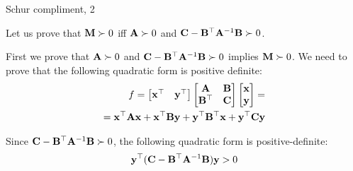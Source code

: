 \documentclass{beamer}
\begin{document}
\begin{frame}{Schur compliment, 2}
	\begin{flushleft}
		
		Let us prove that $\mathbf{M} \succ 0$ iff $\mathbf{A} \succ 0$ and $\mathbf{C} - \mathbf{B}^\top\mathbf{A}^{-1}\mathbf{B} \succ 0$.
		
		\bigskip
		
		First we prove that $\mathbf{A} \succ 0$ and $\mathbf{C} - \mathbf{B}^\top\mathbf{A}^{-1}\mathbf{B} \succ 0$ implies $\mathbf{M} \succ 0$. We need to prove that the following quadratic form is positive definite:
		\begin{align}
			f = 
			\begin{bmatrix}
				\mathbf{x}^\top & 
				\mathbf{y}^\top
			\end{bmatrix}
			\begin{bmatrix}
				\mathbf{A} & \mathbf{B} \\
				\mathbf{B}^\top & \mathbf{C}
			\end{bmatrix}
			\begin{bmatrix}
			\mathbf{x} \\ 
			\mathbf{y}
			\end{bmatrix} = \\
			= 
			\mathbf{x}^\top \mathbf{A}\mathbf{x} + \mathbf{x}^\top \mathbf{B} \mathbf{y} + \mathbf{y}^\top \mathbf{B}^\top \mathbf{x} + \mathbf{y}^\top \mathbf{C} \mathbf{y}  
		\end{align}
		
		Since $\mathbf{C} - \mathbf{B}^\top\mathbf{A}^{-1}\mathbf{B} \succ 0$, the following quadratic form is positive-definite:
		\begin{align}
			\mathbf{y}^\top (\mathbf{C} - \mathbf{B}^\top\mathbf{A}^{-1}\mathbf{B} ) \mathbf{y} > 0
		\end{align}
		
		
		
	\end{flushleft}
\end{frame}
\end{document}
